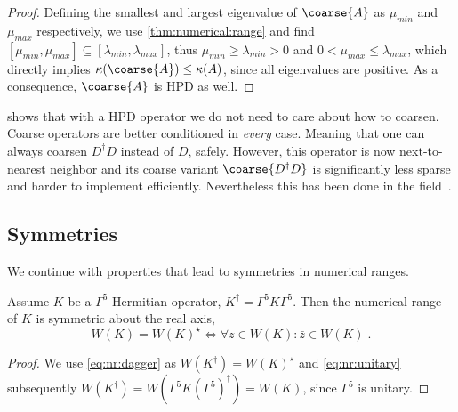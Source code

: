 \begin{proof}
Defining the smallest and largest eigenvalue of $\coarse{A}$ as $\mu_{min}$ and $\mu_{max}$ respectively, we use \cref{thm:numerical:range} and find $[ \mu_{min}, \mu_{max}] \subseteq [ \lambda_{min}, \lambda_{max} ]$, thus $\mu_{min} \geq \lambda_{min} > 0$ and $0 < \mu_{max} \leq \lambda_{max}$, which directly implies $\kappa(\coarse{A}) \leq \kappa(A)$, since all eigenvalues are positive. As a consequence, $\coarse{A}$ is HPD as well.
\end{proof}

 shows that with a HPD operator we do not need to care about how to coarsen.
Coarse operators are better conditioned in \emph{every} case.
Meaning that one can always coarsen $D^{\dagger} D$ instead of $D$, safely.
However, this operator is now next-to-nearest neighbor and its coarse variant $\coarse{D^{\dagger} D}$ is significantly less sparse and harder to implement efficiently.
Nevertheless this has been done in the field~\cite{Cohen:2011ivh,Boyle:2014rwa}.

\subsection{Symmetries}

We continue with properties that lead to symmetries in numerical ranges.

\begin{lemma} \label{lemma:nr:xsym}
Assume $K$ be a $\Gamma^{5}$-Hermitian operator, \ie $K^{\dagger} = \Gamma^{5} K \Gamma^{5}$.
Then the numerical range of $K$ is symmetric about the real axis,
\begin{equation}
W(K) = W(K)^{\star} \iff \forall z \in W(K) \colon \bar{z} \in W(K) \;.
\end{equation}
\end{lemma}

\begin{proof}
We use \cref{eq:nr:dagger} as $W(K^{\dagger}) = W(K)^{\star}$ and \cref{eq:nr:unitary} subsequently $W(K^{\dagger}) = W(\Gamma^{5} K (\Gamma^{5})^{\dagger}) = W(K)$, since $\Gamma^{5}$ is unitary.
\end{proof}

